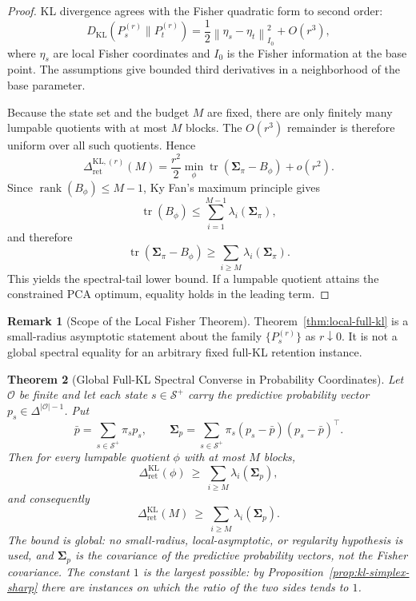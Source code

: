 \documentclass[12pt]{article}
\newtheorem{theorem}{Theorem}[section]
\theoremstyle{definition}
\newtheorem{remark}[theorem]{Remark}
\DeclareMathOperator{\rank}{rank}
\newcommand{\norm}[1]{\left\lVert#1\right\rVert}
\newcommand{\RetKL}{\Delta_{\mathrm{ret}}^{\mathrm{KL}}}
\newcommand{\Splus}{\mathcal S^{+}}
\newcommand{\RetKLr}[1]{\Delta_{\mathrm{ret}}^{\mathrm{KL},(#1)}}
\begin{document}
\begin{proof}
KL divergence agrees with the Fisher quadratic form to second order:
\[
D_{\mathrm{KL}}(P_s^{(r)}\|P_t^{(r)})
=
\frac12
\norm{\eta_s-\eta_t}_{I_0}^2
+
O(r^3),
\]
where $\eta_s$ are local Fisher coordinates and $I_0$ is the Fisher information
at the base point.  The assumptions give bounded third derivatives in a
neighborhood of the base parameter.

Because the state set and the budget $M$ are fixed, there are only finitely
many lumpable quotients with at most $M$ blocks.  The $O(r^3)$ remainder is
therefore uniform over all such quotients.  Hence
\[
\RetKLr{r}(M)
=
\frac{r^2}{2}
\min_{\phi}
\operatorname{tr}(\bm{\Sigma}_\pi-B_\phi)
+
o(r^2).
\]
Since $\rank(B_\phi)\le M-1$, Ky Fan's maximum principle \cite{kyfan1951} gives
\[
\operatorname{tr}(B_\phi)
\le
\sum_{i=1}^{M-1}
\lambda_i(\bm{\Sigma}_\pi),
\]
and therefore
\[
\operatorname{tr}(\bm{\Sigma}_\pi-B_\phi)
\ge
\sum_{i\ge M}
\lambda_i(\bm{\Sigma}_\pi).
\]
This yields the spectral-tail lower bound.  If a lumpable quotient attains the
constrained PCA optimum, equality holds in the leading term.
\end{proof}

\begin{remark}[Scope of the Local Fisher Theorem]
\label{rem:local-fisher-scope}
Theorem~\ref{thm:local-full-kl} is a small-radius asymptotic statement about
the family $\{P_s^{(r)}\}$ as $r\downarrow0$.  It is not a global spectral
equality for an arbitrary fixed full-KL retention instance.
\end{remark}

\begin{theorem}[Global Full-KL Spectral Converse in Probability Coordinates]
\label{thm:global-kl-simplex}
Let $\mathcal O$ be finite and let each state $s\in\Splus$ carry the predictive
probability vector $p_s\in\Delta^{|\mathcal O|-1}$.  Put
\[
\bar p=\sum_{s\in\Splus}\pi_sp_s,
\qquad
\bm{\Sigma}_p
=
\sum_{s\in\Splus}\pi_s(p_s-\bar p)(p_s-\bar p)^{\!\top}.
\]
Then for every lumpable quotient $\phi$ with at most $M$ blocks,
\[
\RetKL(\phi)
\ \ge\
\sum_{i\ge M}\lambda_i(\bm{\Sigma}_p),
\]
and consequently
\[
\RetKL(M)
\ \ge\
\sum_{i\ge M}\lambda_i(\bm{\Sigma}_p).
\]
The bound is global: no small-radius, local-asymptotic, or regularity
hypothesis is used, and $\bm{\Sigma}_p$ is the covariance of the predictive
\emph{probability vectors}, not the Fisher covariance.  The constant $1$ is
the largest possible: by Proposition~\ref{prop:kl-simplex-sharp} there are
instances on which the ratio of the two sides tends to $1$.
\end{theorem}
\end{document}

